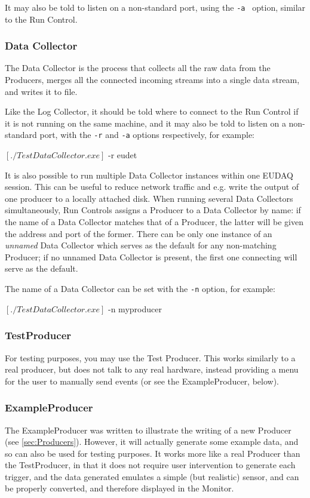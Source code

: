 It may also be told to listen on a non-standard port, using the \texttt{-a } option, similar to the Run Control.

\subsubsection{Data Collector}
The Data Collector is the process that collects all the raw data from the Producers,
merges all the connected incoming streams into a single data stream, and writes it to file.

Like the Log Collector, it should be told where to connect to the Run Control if it is not running on the same machine,
and it may also be told to listen on a non-standard port, with the \texttt{-r} and \texttt{-a} options respectively, for example:
\begin{listing}[mybash]
$[./TestDataCollector.exe]$ -r eudet
\end{listing}

It is also possible to run multiple Data Collector instances within
one EUDAQ session. This can be useful to reduce network traffic and
e.g. write the output of one producer to a locally attached disk. When running
several Data Collectors simultaneously, Run Controls assigns a
Producer to a Data Collector by name: if the name of a Data Collector
matches that of a Producer, the latter will be given the address and
port of the former. There can be only one instance of an \emph{unnamed} Data
Collector which serves as the default for any non-matching Producer;
if no unnamed Data Collector is present, the first one connecting will
serve as the default.

The name of a Data Collector can be set with the
\texttt{-n} option, for example:
\begin{listing}[mybash]
$[./TestDataCollector.exe]$ -n myproducer
\end{listing}


\subsubsection{TestProducer}
For testing purposes, you may use the Test Producer.
This works similarly to a real producer, but does not talk to any real hardware,
instead providing a menu for the user to manually send events
(or see the ExampleProducer, below).

\subsubsection{ExampleProducer}
The ExampleProducer was written to illustrate the writing of a new Producer (see \autoref{sec:Producers}).
However, it will actually generate some example data, and so can also be used for testing purposes.
It works more like a real Producer than the TestProducer,
in that it does not require user intervention to generate each trigger,
and the data generated emulates a simple (but realistic) sensor,
and can be properly converted, and therefore displayed in the Monitor.

